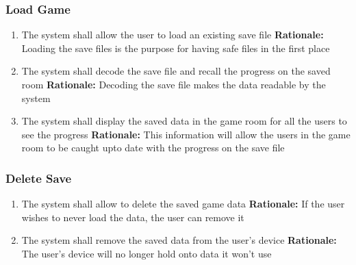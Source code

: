 \documentclass[12pt]{article}
\begin{document}
\subsubsection{Load Game}
\begin{enumerate}[label=LG\arabic*., series=LoadGame]
	\item The system shall allow the user to load an existing save file \newline 
    \textbf{Rationale:} Loading the save files is the purpose for having safe files in the first place
    \item The system shall decode the save file and recall the progress on the saved room\newline 
    \textbf{Rationale:} Decoding the save file makes the data readable by the system
    \item The system shall display the saved data in the game room for all the users to see the progress\newline 
    \textbf{Rationale:} This information will allow the users in the game room to be caught upto date with the progress on the save file
\end{enumerate}

\subsubsection{Delete Save}
\begin{enumerate}[label=DS\arabic*., series=DeleteSave]
	\item The system shall allow to delete the saved game data \newline 
    \textbf{Rationale:} If the user wishes to never load the data, the user can remove it
    \item The system shall remove the saved data from the user's device \newline 
    \textbf{Rationale:} The user's device will no longer hold onto data it won't use
\end{enumerate}
\end{document}
